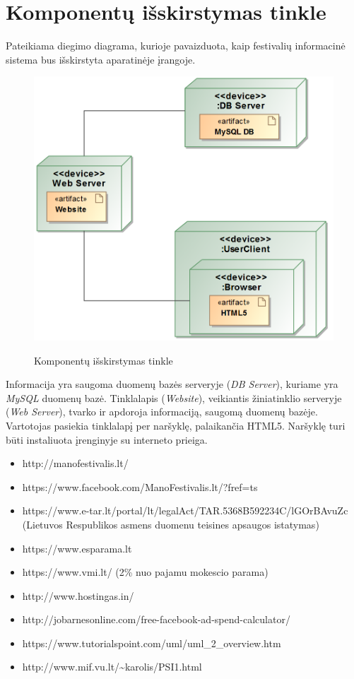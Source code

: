 ﻿\documentclass{VUMIFPSkursinis}
\begin{document}
\section{Komponentų išskirstymas tinkle}
Pateikiama diegimo diagrama, kurioje pavaizduota, kaip festivalių informacinė sistema bus išskirstyta aparatinėje įrangoje. 
\begin{figure}[H]
\centering
    \includegraphics[scale=0.5]{img/PSI3/deploy.PNG}
	\label{uml:22}
	\caption{Komponentų išskirstymas tinkle}
\end{figure}
Informacija yra saugoma duomenų bazės serveryje (\textit{DB Server}), kuriame yra \textit{MySQL} duomenų bazė. Tinklalapis (\textit{Website}), veikiantis žiniatinklio serveryje (\textit{Web Server}), tvarko ir apdoroja informaciją, saugomą duomenų bazėje. Vartotojas pasiekia tinklalapį per naršyklę, palaikančia HTML5. Naršyklę turi būti instaliuota įrenginyje su interneto prieiga.



\begin{itemize}
\item http://manofestivalis.lt/
\item https://www.facebook.com/ManoFestivalis.lt/?fref=ts
\item https://www.e-tar.lt/portal/lt/legalAct/TAR.5368B592234C/lGOrBAvuZc (Lietuvos Respublikos asmens duomenu teisines apsaugos istatymas)
\item https://www.esparama.lt
\item https://www.vmi.lt/ (2\% nuo pajamu mokescio parama)
\item http://www.hostingas.in/
\item http://jobarnesonline.com/free-facebook-ad-spend-calculator/
\item https://www.tutorialspoint.com/uml/uml\_2\_overview.htm
\item http://www.mif.vu.lt/\textasciitilde karolis/PSI1.html
\end{itemize}
\end{document}
